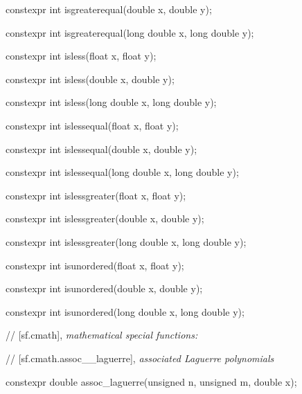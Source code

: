 \documentclass[prd,twocolumn,amsmath,amssymb,nofootinbib,eqsecnum]{revtex4-1}
\newcommand{\highlight}[1]{{\color{red} #1}}
\newcommand{\oldhighlight}[1]{{\color{green} #1}}
\begin{document}
{\oldhighlight{constexpr} int isgreaterequal(double x, double y);

\oldhighlight{constexpr} int isgreaterequal(long double x, long double y);

\vspace{2ex}


\oldhighlight{constexpr} int isless(float x, float y);

\oldhighlight{constexpr} int isless(double x, double y);

\oldhighlight{constexpr} int isless(long double x, long double y);

\vspace{2ex}


\oldhighlight{constexpr} int islessequal(float x, float y);

\oldhighlight{constexpr} int islessequal(double x, double y);

\oldhighlight{constexpr} int islessequal(long double x, long double y);

\vspace{2ex}


\oldhighlight{constexpr} int islessgreater(float x, float y);

\oldhighlight{constexpr} int islessgreater(double x, double y);

\oldhighlight{constexpr} int islessgreater(long double x, long double y);

\vspace{2ex}


\oldhighlight{constexpr} int isunordered(float x, float y);

\oldhighlight{constexpr} int isunordered(double x, double y);

\oldhighlight{constexpr} int isunordered(long double x, long double y);

\vspace{2ex}

// [sf.cmath], {\em mathematical special functions:}

\vspace{2ex}

// [sf.cmath.assoc\_\_laguerre], {\em associated Laguerre polynomials}

\vspace{2ex}

\highlight{constexpr} double assoc\_laguerre(unsigned n, unsigned m, double x);
	
}
\end{document}
